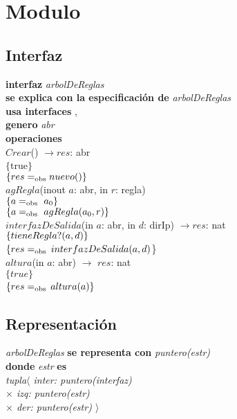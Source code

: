 \section*{Modulo }

\subsection*{Interfaz}
\textbf{interfaz} \textit{arbolDeReglas}\\
\textbf{se explica con la especificaci\'on de} \textit{arbolDeReglas}\\
\textbf{usa interfaces} , \\
\textbf{genero} \textit{abr}\\

\textbf{operaciones}\\

$Crear$() $\longrightarrow res$: abr\\
$\{$true$\}$\\
$\{{res} =_{\mathrm{obs}} nuevo()\}$\\

$agRegla$(inout $a$: abr, in $r$: regla)\\
$\{\sombreritoWide{a} \igobs\ a_0\}$\\
$\{\sombreritoWide{a} \igobs\ agRegla(a_0,\sombreritoWide{r})\}$\\

$interfazDeSalida$(in $a$: abr, in $d$: dirIp) $\longrightarrow res$: nat\\
$\{tieneRegla?({a},{d})\}$\\
$\{{res}=_{\mathrm{obs}}$ $interfazDeSalida({a},{d})$\}\\

$altura$(in $a$: abr) $\longrightarrow$	$res$: nat\\
$\{true\}$\\
$\{{res}=_{\mathrm{obs}}$ $altura({a})\}$\\


\subsection*{Representaci\'on}
\textit{arbolDeReglas} \textbf{se representa con} \textit{puntero(estr)}\\
\textbf{donde} \textit{estr} \textbf{es}\\
\textit{tupla$\langle$ inter: puntero(interfaz)\\
\hspace*{1.1cm}$\times$ izq: puntero(estr)\\
\hspace*{1.1cm}$\times$ der: puntero(estr) $\rangle$}
\vspace{33pt}


